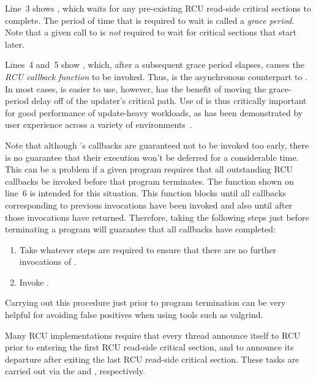 \documentclass[letterpaper,10pt]{article}
\begin{document}
Line~3 shows , which waits for any pre-existing
RCU read-side critical sections to complete.
The period of time that  is required to wait is
called a \emph{grace period}.
Note that a given call to  is \emph{not} required to
wait for critical sections that start later.

Lines~4 and~5 show , which, after a subsequent grace period
elapses, causes the  \emph{RCU callback function} to be invoked.
Thus,  is the asynchronous counterpart to
.
In most cases,  is easier to use, however, 
has the benefit of moving the grace-period delay off of the updater's
critical path.
Use of  is thus critically important for good performance of
update-heavy workloads, as has been demonstrated by user experience
across a variety of environments~\cite{PaulEMcKenney2015ReadMostly}.

Note that although 's callbacks are guaranteed not to be
invoked too early, there is no guarantee that their execution won't be
deferred for a considerable time.
This can be a problem if a given program requires that all outstanding
RCU callbacks be invoked before that program terminates.
The  function shown on line~6 is intended for this
situation.
This function blocks until all callbacks corresponding to previous
 invocations have been invoked and also until after
those invocations have returned.
Therefore, taking the following steps just before terminating a program
will guarantee that all callbacks have completed:

\begin{enumerate}
\item	Take whatever steps are required to ensure that there are no
	further invocations of .
\item	Invoke .
\end{enumerate}

Carrying out this procedure just prior to program termination can be very
helpful for avoiding false positives when using tools such as valgrind.

Many RCU implementations require that every thread announce itself to
RCU prior to entering the first RCU read-side critical section, and
to announce its departure after exiting the last RCU read-side
critical section.
These tasks are carried out via the  and
, respectively.
\end{document}
